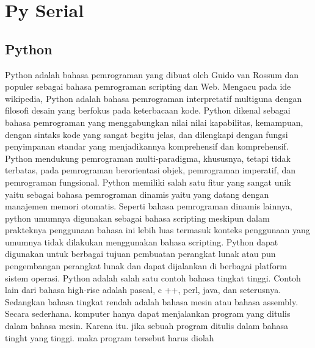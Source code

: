 \section{Py Serial}

	\subsection{Python}
	Python adalah bahasa pemrograman yang dibuat oleh Guido van Rossum dan populer sebagai bahasa pemrograman scripting dan Web. Mengacu pada ide wikipedia, Python adalah bahasa pemrograman interpretatif multiguna dengan filosofi desain yang berfokus pada keterbacaan kode. 
	Python dikenal sebagai bahasa pemrograman yang menggabungkan nilai nilai kapabilitas, kemampuan, dengan sintaks kode yang sangat begitu jelas, dan dilengkapi dengan fungsi penyimpanan standar yang menjadikannya komprehensif dan komprehensif. 
	Python mendukung pemrograman multi-paradigma, khususnya, tetapi tidak terbatas, pada pemrograman berorientasi objek, pemrograman imperatif, dan pemrograman fungsional. 
	Python memiliki salah satu fitur yang sangat unik yaitu sebagai bahasa pemrograman dinamis yaitu yang datang dengan manajemen memori otomatis. Seperti bahasa 
	pemrograman dinamis lainnya, python umumnya digunakan sebagai bahasa scripting meskipun dalam prakteknya penggunaan bahasa ini lebih luas termasuk konteks penggunaan yang umumnya tidak dilakukan menggunakan bahasa scripting. 
	Python dapat digunakan untuk berbagai tujuan pembuatan perangkat lunak atau pun pengembangan perangkat lunak dan dapat dijalankan di berbagai platform sistem operasi. Python adalah salah satu contoh bahasa tingkat tinggi. 
	Contoh lain dari bahasa high-rise adalah pascal, c ++, perl, java, dan seterusnya. Sedangkan bahasa tingkat rendah adalah bahasa mesin atau bahasa assembly. Secara sederhana. komputer hanya dapat menjalankan program yang ditulis dalam bahasa mesin. 
	Karena itu. jika sebuah program ditulis dalam bahasa tinght yang tinggi. maka program tersebut harus diolah 